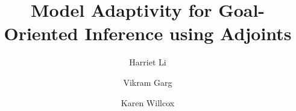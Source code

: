 \documentclass[review,sort&compress]{elsarticle}
\begin{document}

\begin{frontmatter}

\title{Model Adaptivity for Goal-Oriented Inference using Adjoints}


\author[adr1]{Harriet Li}
\address[adr1]{Department of Aeronautics and Astronautics, Massachusetts Institute of Technology, Cambridge, MA, 02139, USA; \texttt{hli@alum.mit.edu}}
\author[adr2]{Vikram Garg}
\address[adr2]{Institute for Computational Engineering and Sciences, University of Texas, Austin, TX, 78712, USA; \texttt{vikram.v.garg@gmail.com}}
\author[adr3]{Karen Willcox}
\address[adr3]{Department of Aeronautics and Astronautics, Massachusetts Institute of Technology, Cambridge, MA, 02139, USA; \texttt{kwillcox@mit.edu}}


\end{frontmatter}
\end{document}
